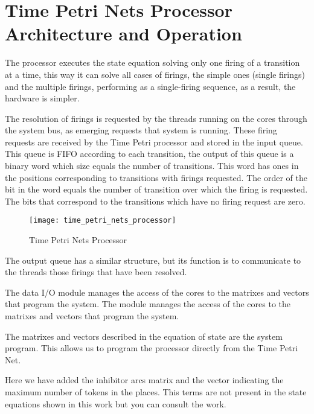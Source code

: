\section{Time Petri Nets Processor Architecture and Operation}
	The processor executes the state equation solving only one firing of a transition at a time, this
	way it can solve all cases of firings, the simple ones (single firings) and the multiple firings, 
	performing as a single-firing sequence, as a result, the hardware is simpler.
	
	The resolution of firings is requested by the threads running on the cores through the system bus, 
	as emerging requests that system is running. These firing requests are received by the Time Petri 
	processor and stored in the input queue. This queue is FIFO according to each transition, the output 
	of this queue is a binary word which size equals the number of transitions. This word has ones in 
	the positions corresponding to transitions with firings requested. The order of the bit in the word 
	equals the number of transition over which the firing is requested. The bits that correspond to the 
	transitions which have no firing request are zero.
		
	\begin{figure}[ht]
        \centering
        \texttt{[image: time\_petri\_nets\_processor]}
        \caption{Time Petri Nets Processor}
        \label{fig:time_petri_nets_processor}
    \end{figure}
    
    The output queue has a similar structure, but its function is to communicate to the threads those 
	firings that have been resolved.
	
	The data I/O module manages the access of the cores to the matrixes and vectors that program the 
	system. The module manages the access of the cores to the matrixes and vectors that program the system. 
	
	The matrixes and vectors described in the equation of state are the system program. This allows 
	us to program the processor directly from the Time Petri Net.
	
    Here we have added the inhibitor arcs matrix and the vector indicating the maximum number of tokens 
    in the places. This terms are not present in the state equations shown in this work but you can 
    consult the work\cite{paperProcesador}.\\
    
